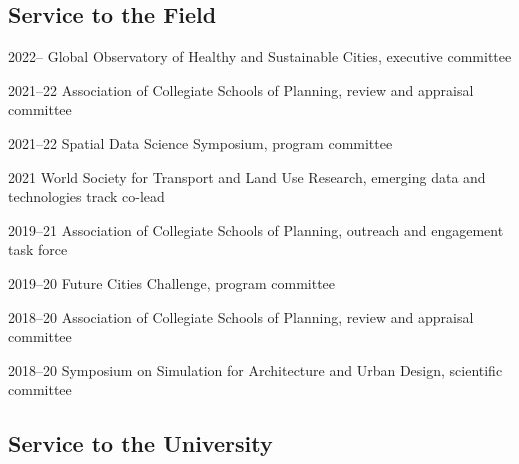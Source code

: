 \documentclass[11pt,letterpaper]{report}
\begin{document}
    \subsection*{Service to the Field}

    \begin{tablist}

        \item[2022--]   \tab{}Global Observatory of Healthy and Sustainable Cities, executive committee
        \item[2021--22] \tab{}Association of Collegiate Schools of Planning, review and appraisal committee
        \item[2021--22] \tab{}Spatial Data Science Symposium, program committee
        \item[2021]     \tab{}World Society for Transport and Land Use Research, emerging data and technologies track co-lead
        \item[2019--21] \tab{}Association of Collegiate Schools of Planning, outreach and engagement task force
        \item[2019--20] \tab{}Future Cities Challenge, program committee
        \item[2018--20] \tab{}Association of Collegiate Schools of Planning, review and appraisal committee
        \item[2018--20] \tab{}Symposium on Simulation for Architecture and Urban Design, scientific committee

    \end{tablist}

    \subsection*{Service to the University}
\end{document}
